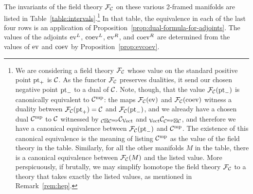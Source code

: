 \documentclass{amsart}
\begin{document}
The invariants of the field theory $\mathcal F_\mathcal C$ on these various 2-framed manifolds are listed in Table~\ref{table:intervals}.\footnote{We are considering a field theory $\mathcal F_\mathcal C$ whose value on the standard positive point $\mathrm{pt}_+$ is $\mathcal C$.  As the functor $\mathcal F_\mathcal C$ preserves dualities, it send our chosen negative point $\mathrm{pt}_-$ to a dual of $\mathcal C$.  Note, though, that the value $\mathcal F_\mathcal C(\mathrm{pt}_-)$ is canonically equivalent to $\mathcal C^{\mathrm{mp}}$: the maps $\mathcal F_\mathcal C(\mathrm{ev})$ and $\mathcal F_\mathcal C(\mathrm{coev})$ witness a duality between $\mathcal F_\mathcal C(\mathrm{pt}_+) = \mathcal C$ and $\mathcal F_\mathcal C(\mathrm{pt}_-)$, and we already have a chosen dual $\mathcal C^{\mathrm{mp}}$ to $\mathcal C$ witnessed by ${}_{\mathcal C \boxtimes \mathcal C^{\mathrm{mp}}} \mathcal C_{\mathrm{Vect}}$ and ${}_{\mathrm{Vect}} \mathcal C_{\mathcal C^{\mathrm{mp}} \boxtimes \mathcal C}$, and therefore we have a canonical equivalence between $\mathcal F_\mathcal C(\mathrm{pt}_-)$ and $\mathcal C^{\mathrm{mp}}$.  The existence of this canonical equivalence is the meaning of listing $\mathcal C^{\mathrm{mp}}$ as the value of the field theory in the table.  Similarly, for all the other manifolds $M$ in the table, there is a canonical equivalence between $\mathcal F_\mathcal C(M)$ and the listed value.  More perspicuously, if brutally, we may simplify homotope the field theory $\mathcal F_\mathcal C$ to a theory that takes exactly the listed values, as mentioned in Remark~\ref{rem:hep}.}  In that table, the equivalence in each of the last four rows is an application of Proposition~\ref{prop:dual-formula-for-adjoints}.  The values of the adjoints $\mathrm{ev}^L$, $\mathrm{coev}^L$, $\mathrm{ev}^R$, and $\mathrm{coev}^R$ are determined from the values of $\mathrm{ev}$ and $\mathrm{coev}$ by Proposition~\ref{prop:evcoev}.
\end{document}
